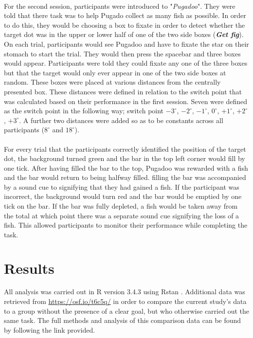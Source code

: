 \documentclass[12pt]{article}
\begin{document}
\paragraph{} For the second session, participants were introduced to "\textit{Pugadoo}". They were told that there task was to help Pugado collect as many fish as possible. In order to do this, they would be choosing a box to fixate in order to detect whether the target dot was in the upper or lower half of one of the two side boxes (\textit{\textbf{Get fig}}). On each trial, participants would see Pugadoo and have to fixate the star on their stomach to start the trial. They would then press the spacebar and three boxes would appear. Participants were told they could fixate any one of the three boxes but that the target would only ever appear in one of the two side boxes at random. These boxes were placed at various distances from the centrally presented box. These distances were defined in relation to the switch point that was calculated based on their performance in the first session. Seven were defined as the switch point in the following way; switch point $-3^{\circ}$, $-2^{\circ}$, $-1^{\circ}$, $0^{\circ}$, $+1^{\circ}$, $+2^{\circ}$, $+3^{\circ}$. A further two distances were added so as to be constants across all participants ($8^{\circ}$ and $18^{\circ}$). 

\paragraph{} For every trial that the participants correctly identified the position of the target dot, the background turned green and the bar in the top left corner would fill by one tick. After having filled the bar to the top, Pugadoo was rewarded with a fish and the bar would return to being halfway filled. filling the bar was accompanied by a sound cue to signifying that they had gained a fish. If the participant was incorrect, the background would turn red and the bar would be emptied by one tick on the bar. If the bar was fully depleted, a fish would be taken away from the total at which point there was a separate sound cue signifying the loss of a fish. This allowed participants to monitor their performance while completing the task. 

\section*{Results}
\paragraph{} All analysis was carried out in R version 3.4.3 \citep{R} using Rstan \citep{Rstan,Stan}. Additional data was retrieved from \url{https://osf.io/t6c5q/} in order to compare the current study's data to a group without the presence of a clear goal, but who otherwise carried out the same task. The full methods and analysis of this comparison data can be found by following the link provided. 
\end{document}
